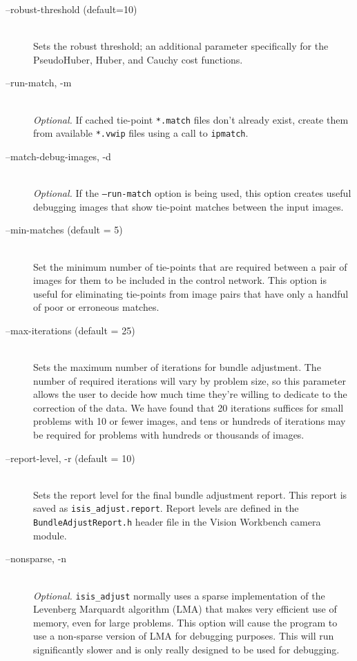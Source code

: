 \begin{description}
\item[--robust-threshold \textnormal{\small{(default=10)}}] \hfill \\
  Sets the robust threshold; an additional parameter specifically for
  the PseudoHuber, Huber, and Cauchy cost functions.

\item[--run-match, -m] \hfill \\
  \emph{Optional.} If cached tie-point \texttt{*.match} files don't
  already exist, create them from available \texttt{*.vwip} files using a
  call to \texttt{ipmatch}.

\item[--match-debug-images, -d] \hfill \\
  \emph{Optional.} If the {\tt --run-match} option is being used, this
  option creates useful debugging images that show tie-point matches
  between the input images.

\item[--min-matches \textnormal{\small{(default = 5)}}] \hfill \\
  Set the minimum number of tie-points that are required between a
  pair of images for them to be included in the control network. This
  option is useful for eliminating tie-points from image pairs that
  have only a handful of poor or erroneous matches.

\item[--max-iterations \textnormal{\small{(default = 25)}}] \hfill \\
  Sets the maximum number of iterations for bundle adjustment. The
  number of required iterations will vary by problem size, so this
  parameter allows the user to decide how much time they're willing
  to dedicate to the correction of the data.  We have found that 20
  iterations suffices for small problems with 10 or fewer images, and
  tens or hundreds of iterations may be required for problems with
  hundreds or thousands of images.

\item[--report-level, -r \textnormal{\small{(default = 10)}}] \hfill \\
  Sets the report level for the final bundle adjustment report.  This
  report is saved as \texttt{isis\_adjust.report}. Report levels are
  defined in the \texttt{BundleAdjustReport.h} header file in the Vision
  Workbench camera module.

\item[--nonsparse, -n] \hfill \\
  \emph{Optional.} \texttt{isis\_adjust} normally uses a sparse
  implementation of the Levenberg Marquardt algorithm (LMA) that makes
  very efficient use of memory, even for large problems.  This option
  will cause the program to use a non-sparse version of LMA for
  debugging purposes.  This will run significantly slower and is
  only really designed to be used for debugging.


\end{description}
